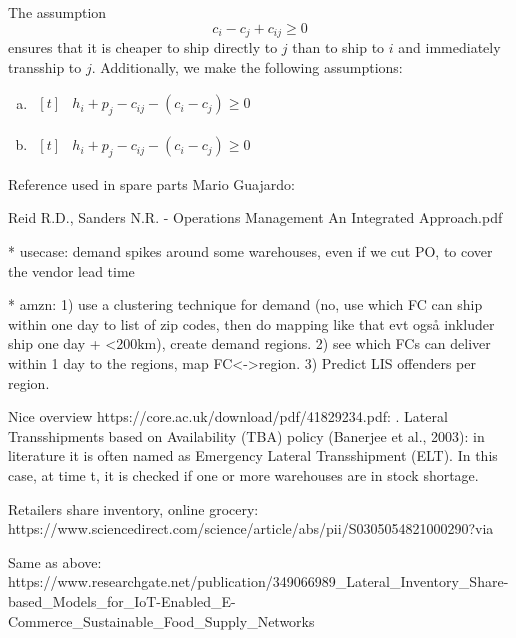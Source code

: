 \documentclass[../../main.tex]{subfiles}
\begin{document}
The assumption
%
\begin{equation}
    c_i - c_j + c_{ij} \geq 0
\end{equation}
%
ensures that it is cheaper to ship directly to \(j\) than to ship to \(i\) and immediately transship to \(j\). Additionally, we make the following assumptions: 
%
\begin{enumerate}[a)]
\item \hfill$\begin{aligned}[t]
&h_i + p_j - c_{ij} - (c_i - c_j) \geq 0
\end{aligned}$\hfill\null
\item \hfill$\begin{aligned}[t]
&h_i + p_j - c_{ij} - (c_i - c_j) \geq 0
\end{aligned}$\hfill\null
\end{enumerate}
%












Reference used in spare parts Mario Guajardo: %


Reid R.D., Sanders N.R. - Operations Management An Integrated Approach.pdf


* usecase: demand spikes around some warehouses, even if we cut PO, to cover the vendor lead time

* amzn: 1) use a clustering technique for demand (no, use which FC can ship within one day to list of zip codes, then do mapping like that evt også inkluder ship one day + <200km), create demand regions. 2) see which FCs can deliver within 1 day to the regions, map FC<->region. 3) Predict LIS offenders per region. 

Nice overview https://core.ac.uk/download/pdf/41829234.pdf:
. Lateral Transshipments based on Availability (TBA) policy (Banerjee et al., 2003): in literature it is often named as Emergency Lateral Transshipment (ELT). In this case, at time t, it is checked if one or more warehouses are in stock shortage. 

Retailers share inventory, online grocery: https://www.sciencedirect.com/science/article/abs/pii/S0305054821000290?via%

Same as above:
https://www.researchgate.net/publication/349066989_Lateral_Inventory_Share-based_Models_for_IoT-Enabled_E-Commerce_Sustainable_Food_Supply_Networks


\end{document}
